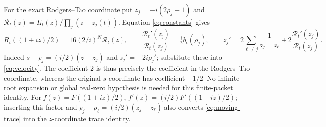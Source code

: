 \documentclass[11pt]{article}
\begin{document}
For the exact Rodgers--Tao coordinate put
$z_j=-i(2\rho_j-1)$ and
$\mathcal R_t(z)=H_t(z)/\prod_j(z-z_j(t))$.
Equation \eqref{eq:constants} gives
\begin{equation}\label{eq:RT-coordinate}
R_t((1+iz)/2)=16(2/i)^N\mathcal R_t(z),\qquad
\frac{\mathcal R_t'(z_j)}{\mathcal R_t(z_j)}
=\tfrac i2 b_t(\rho_j),\qquad
z_j'=2\sum_{\ell\ne j}\frac1{z_j-z_\ell}
+2\frac{\mathcal R_t'(z_j)}{\mathcal R_t(z_j)}.
\end{equation}
Indeed $s-\rho_j=(i/2)(z-z_j)$ and $z_j'=-2i\rho_j'$;
substitute these into \eqref{eq:velocity}. The coefficient $2$
is thus precisely the coefficient in the Rodgers--Tao coordinate,
whereas the original $s$ coordinate has coefficient $-1/2$.
No infinite root expansion or global real-zero hypothesis is needed
for this finite-packet identity. For $f(z)=F((1+iz)/2)$,
$f'(z)=(i/2)F'((1+iz)/2)$; inserting this factor and
$\rho_j-\rho_\ell=(i/2)(z_j-z_\ell)$ also converts
\eqref{eq:moving-trace} into the $z$-coordinate trace identity.
\end{document}
